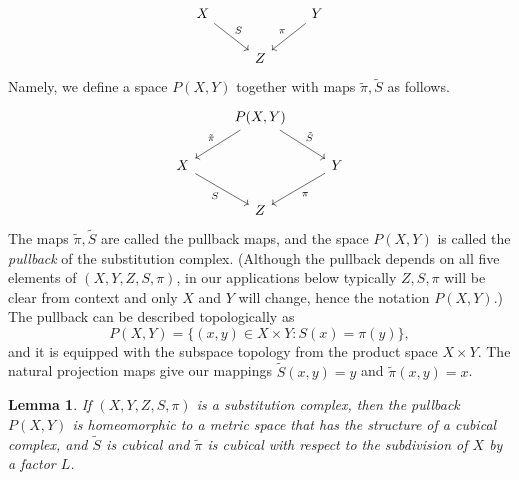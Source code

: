 \documentclass{amsart}
\theoremstyle{plain}
\newtheorem{lemma}[theorem]{Lemma}
\theoremstyle{definition}
\numberwithin{equation}{section}
\numberwithin{theorem}{section}
\begin{document}
\[\begin{tikzcd}
	X && Y \\
	& Z
	\arrow["S", from=1-1, to=2-2]
	\arrow["\pi"', from=1-3, to=2-2]
\end{tikzcd}\]
Namely, we define a space $P(X,Y)$ together with maps $\tilde{\pi}, \tilde{S}$ as follows.
\[\begin{tikzcd}
	& {P(X,Y)} \\
	{X} && {Y} \\
	& Z
	\arrow["{S}"', from=2-1, to=3-2]
	\arrow["{\pi}", from=2-3, to=3-2]
	\arrow["{\tilde{\pi}}"', from=1-2, to=2-1]
	\arrow["{\tilde{S}}", from=1-2, to=2-3]
\end{tikzcd}\]
The maps $\tilde{\pi}, \tilde{S}$ are called the pullback maps, and the space $P(X,Y)$ is called the \emph{pullback} of the substitution complex. (Although the pullback depends on all five elements of $(X,Y,Z,S,\pi)$, in our applications below typically $Z,S,\pi$ will be clear from context and only $X$ and $Y$ will change, hence the notation $P(X,Y)$.) The pullback can be described topologically as
\[
P(X,Y)=\{(x,y)\in X\times Y: S(x)=\pi(y)\},
\]
and it is equipped with the subspace topology from the product space $X\times Y$. The natural projection maps give our mappings $\tilde{S}(x,y)=y$ and $\tilde{\pi}(x,y)=x$. 

\begin{lemma}\label{lem:cubicallimit} If $(X,Y,Z,S, \pi)$ is a substitution complex, then the pullback $P(X,Y)$ is homeomorphic to a metric space that has the structure of a cubical complex, and  $\tilde{S}$ is cubical and $\tilde{\pi}$ is cubical with respect to the subdivision of $X$ by a factor $L$.
\end{lemma}
\end{document}
